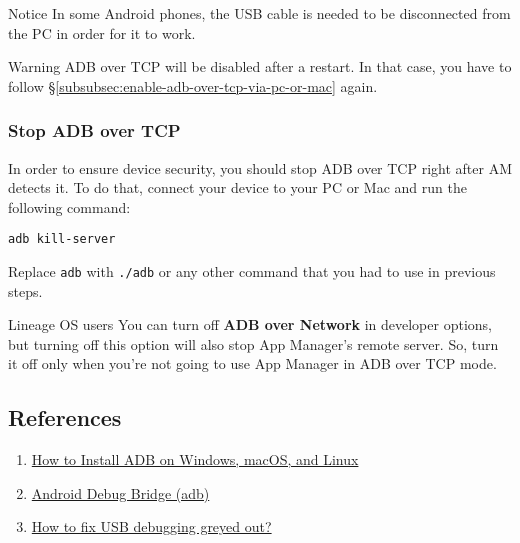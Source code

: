 \begin{tip}{Notice}
    In some Android phones, the USB cable is needed to be disconnected from the PC in order for it to work.
\end{tip}

\begin{warning}{Warning}
    ADB over TCP will be disabled after a restart. In that case, you have to follow
    §\cref{subsubsec:enable-adb-over-tcp-via-pc-or-mac} again.
\end{warning}

\subsubsection{Stop ADB over TCP}\label{subsubsec:stop-adb-over-tcp}
In order to ensure device security, you should stop ADB over TCP right after AM detects it. To do that, connect your device to your PC or Mac and run the following command:
\begin{verbatim}
adb kill-server
\end{verbatim}
Replace \texttt{adb} with \texttt{./adb} or any other command that you had to use in previous steps.

\begin{warning}{Lineage OS users}
    You can turn off \textbf{ADB over Network} in developer options, but turning off this option will also stop App
    Manager's remote server. So, turn it off only when you're not going to use App Manager in ADB over TCP mode.
\end{warning}

\subsection{References}\label{subsec:references}
\begin{enumerate}
    \item \href{https://www.xda-developers.com/install-adb-windows-macos-linux}{How to Install ADB on Windows, macOS, and Linux}
    \item \href{https://developer.android.com/studio/command-line/adb}{Android Debug Bridge (adb)}
    \item \href{https://www.syncios.com/android/fix-usb-debugging-grey-out.html}{How to fix USB debugging greyed out?}
\end{enumerate}
